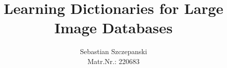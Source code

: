 \title{Learning Dictionaries for Large Image Databases}
\author{Sebastian Szczepanski \\ Matr.Nr.: 220683}
\maketitle